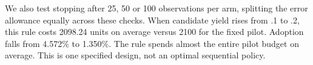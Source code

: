 We also test stopping after 25, 50 or 100 observations per arm, splitting the error allowance equally across these checks. When candidate yield rises from .1 to .2, this rule costs 2098.24 units on average versus 2100 for the fixed pilot. Adoption falls from 4.572\% to 1.350\%. The rule spends almost the entire pilot budget on average. This is one specified design, not an optimal sequential policy.

